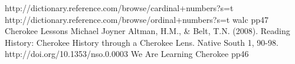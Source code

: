 

\begin{thebibliography}{99}
 http://dictionary.reference.com/browse/cardinal+numbers?s=t
 http://dictionary.reference.com/browse/ordinal+numbers?s=t
 walc pp47
 Cherokee Lessons Michael Joyner
 Altman, H.M., \& Belt, T.N. (2008). Reading History: Cherokee History through a Cherokee Lens. Native South 1, 90-98. http://doi.org/10.1353/nso.0.0003
 We Are Learning Cherokee pp46
\end{thebibliography}
